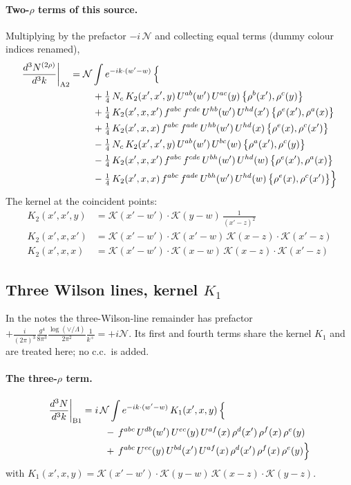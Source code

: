 \documentclass[10pt]{article}
\numberwithin{equation}{section}
\newcommand{\KK}{\mathcal K}
\newcommand{\NN}{\mathcal N}
\begin{document}
\paragraph{Two-$\rho$ terms of this source.} Multiplying by the prefactor $-i\,\NN$ and collecting equal terms (dummy colour indices renamed),
\begin{align}
\frac{d^3N^{(2\rho)}}{d^3k}\bigg|_{\rm A2}={}&\NN\int e^{-ik\cdot(w'-w)}\,\Big\{\notag\\
&\quad +\tfrac14\,N_{c}\,K_2(x',x',y)\,U^{ab}(w')\,U^{ac}(y)\,\big\{\rho^{b}(x'),\rho^{c}(y)\big\}\notag\\
&\quad +\tfrac14\,K_2(x',x,x')\,f^{abc}\,f^{cde}\,U^{hb}(w')\,U^{hd}(x')\,\big\{\rho^{e}(x'),\rho^{a}(x)\big\}\notag\\
&\quad +\tfrac14\,K_2(x',x,x)\,f^{abc}\,f^{ade}\,U^{hb}(w')\,U^{hd}(x)\,\big\{\rho^{e}(x),\rho^{c}(x')\big\}\notag\\
&\quad -\tfrac14\,N_{c}\,K_2(x',x',y)\,U^{ab}(w')\,U^{bc}(w)\,\big\{\rho^{a}(x'),\rho^{c}(y)\big\}\notag\\
&\quad -\tfrac14\,K_2(x',x,x')\,f^{abc}\,f^{cde}\,U^{bh}(w')\,U^{hd}(w)\,\big\{\rho^{e}(x'),\rho^{a}(x)\big\}\notag\\
&\quad -\tfrac14\,K_2(x',x,x)\,f^{abc}\,f^{ade}\,U^{bh}(w')\,U^{hd}(w)\,\big\{\rho^{e}(x),\rho^{c}(x')\big\}\Big\}\label{R:eq:res-A2}
\end{align}
The kernel at the coincident points:
\begin{align*}
K_2(x',x',y)&=\KK(x'-w')\cdot\KK(y-w)\,\frac{1}{(x'-z)^2}\\K_2(x',x,x')&=\KK(x'-w')\cdot\KK(x'-w)\,\KK(x-z)\cdot\KK(x'-z)\\K_2(x',x,x)&=\KK(x'-w')\cdot\KK(x-w)\,\KK(x-z)\cdot\KK(x'-z)
\end{align*}
\subsection{Three Wilson lines, kernel $K_1$}\label{R:sec:B1}
In the notes the three-Wilson-line remainder has prefactor $+\frac{i}{(2\pi)^3}\frac{g^4}{8\pi^3}\frac{\log(\vee/\Lambda)}{2\pi^2}\frac1{k^+}=+i\NN$. Its first and fourth terms share the kernel $K_1$ and are treated here; no c.c.\ is added.
\paragraph{The three-$\rho$ term.}
\begin{align}
\frac{d^3N}{d^3k}\bigg|_{\rm B1}={}&i\,\NN\int e^{-ik\cdot(w'-w)}\,K_1(x',x,y)\,\Big\{\notag\\
&\quad -\,f^{abc}\,U^{db}(w')\,U^{ec}(y)\,U^{af}(x)\,\rho^{d}(x')\,\rho^{f}(x)\,\rho^{e}(y)\notag\\
&\quad +\,f^{abc}\,U^{ec}(y)\,U^{bd}(x')\,U^{af}(x)\,\rho^{d}(x')\,\rho^{f}(x)\,\rho^{e}(y)\Big\}\label{R:eq:in-B1}
\end{align}
with $K_1(x',x,y)=\KK(x'-w')\cdot\KK(y-w)\,\KK(x-z)\cdot\KK(y-z)$.
\end{document}
